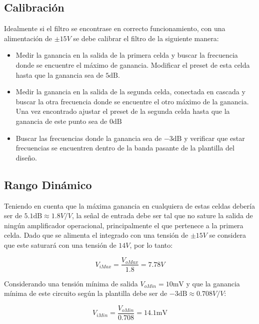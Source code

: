 \subsection{Calibración}

Idealmente si el filtro se encontrase en correcto funcionamiento, con una alimentación de $\pm 15 V$ se debe calibrar el filtro de la siguiente manera:

\begin{itemize}
\item Medir la ganancia en la salida de la primera celda y buscar la frecuencia donde se encuentre el máximo de ganancia. Modificar el preset de esta celda hasta que la ganancia sea de $5 \si{\deci\bel}$.
\item Medir la ganancia en la salida de la segunda celda, conectada en cascada y buscar la otra frecuencia donde se encuentre el otro máximo de la ganancia. Una vez encontrado ajustar el preset de la segunda celda hasta que la ganancia de este punto sea de $0 \si{\deci\bel}$
\item Buscar las frecuencias donde la ganancia sea de $-3 \si{\deci\bel}$ y verificar que estar frecuencias se encuentren dentro de la banda pasante de la plantilla del diseño.
\end{itemize}

\subsection{Rango Dinámico}

Teniendo en cuenta que la máxima ganancia en cualquiera de estas celdas debería ser de $5.1 \si{\deci\bel}\approx 1.8 V/V$, la señal de entrada debe ser tal que no sature la salida de ningún amplificador operacional, principalmente el que pertenece a la primera celda. Dado que se alimenta el integrado con una tensión de $\pm 15 V$ se considera que este saturará con una tensión de $14 V$, por lo tanto:

\begin{equation}
V_{i Max} = \frac{V_{o Max}}{1.8} = 7.78 V
\end{equation}

Considerando una tensión mínima de salida $V_{oMin} = 10 \si{\milli\volt}$ y que la ganancia mínima de este circuito según la plantilla debe ser de
$-3 \si{\deci\bel} \approx 0.708 V/V $:

\begin{equation}
V_{iMin} = \frac{V_{oMin}}{0.708} = 14.1 \si{\milli\volt}
\end{equation}

